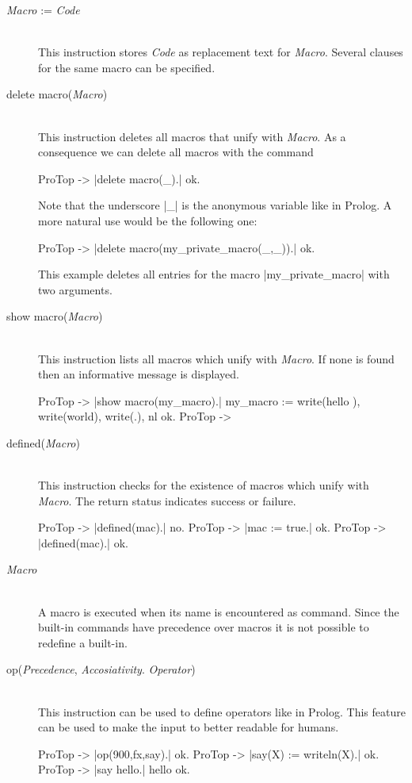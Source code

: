 \begin{description}
  \item [{\em Macro} := {\em Code}]\ \\
  This instruction stores {\em Code} as replacement text for {\em Macro}.
  Several clauses for the same macro can be specified.

  \item [delete macro({\em Macro})]\ \\
  This instruction deletes all macros that unify with {\em Macro}. As a
  consequence we can delete all macros with the command
\begin{BoxedSample}
  ProTop -> |delete macro(_).|
  ok.
\end{BoxedSample}

  Note that the underscore |_| is the anonymous variable like in Prolog.
  A more natural use would be the following one:
\begin{BoxedSample}
  ProTop -> |delete macro(my_private_macro(_,_)).|
  ok.
\end{BoxedSample}

  This example deletes all entries for the macro |my_private_macro| with two
  arguments.

  \item [show macro({\em Macro})]\ \\
  This instruction lists all macros which unify with {\em Macro}. If none is
  found then an informative message is displayed.
\begin{BoxedSample}
  ProTop -> |show macro(my_macro).|
  my\_macro := write(hello ), write(world), write(.), nl
  ok.
  ProTop -> 
\end{BoxedSample}

  \item [defined({\em Macro})]\ \\
  This instruction checks for the existence of macros which unify with {\em
  Macro}. The return status indicates success or failure.
\begin{BoxedSample}
  ProTop -> |defined(mac).|
  no.
  ProTop -> |mac := true.|
  ok.
  ProTop -> |defined(mac).|
  ok.
\end{BoxedSample}

  \item [{\em Macro}]\ \\
  A macro is executed when its name is encountered as command. Since the
  built-in commands have precedence over macros it is not possible to redefine
  a built-in.

  \item [op({\em Precedence}, {\em Accosiativity}. {\em Operator})]\ 
    \\
    This instruction can be used to define operators like in Prolog. This
    feature can be used to make the input to \ProTop{} better readable for
    humans. 
\begin{BoxedSample}
  ProTop -> |op(900,fx,say).|
  ok.
  ProTop -> |say(X) := writeln(X).|
  ok.
  ProTop -> |say hello.|
  hello
  ok.
\end{BoxedSample}
\end{description}

